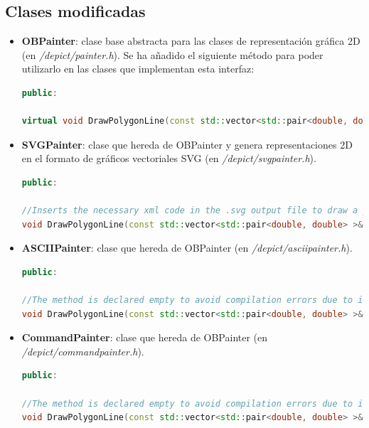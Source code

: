 \subsection{Clases modificadas}
\begin{itemize}
    \item \textbf{OBPainter}: clase base abstracta para las clases de representación gráfica 2D (en \textit{/depict/painter.h}). Se ha añadido el siguiente método para poder utilizarlo en las clases que implementan esta interfaz:
    \begin{lstlisting}[language=C++]
        public: 
    
virtual void DrawPolygonLine(const std::vector<std::pair<double, double> >& points) = 0;
    \end{lstlisting}

    \item \textbf{SVGPainter}: clase que hereda de OBPainter y genera representaciones 2D en el formato de gráficos vectoriales SVG (en \textit{/depict/svgpainter.h}).
    \begin{lstlisting}[language=C++]
        public: 
    
//Inserts the necessary xml code in the .svg output file to draw a polygon according to the vector of points specified by @p points
void DrawPolygonLine(const std::vector<std::pair<double, double> >& points);
    \end{lstlisting}

    \item \textbf{ASCIIPainter}: clase que hereda de OBPainter (en \textit{/depict/asciipainter.h}).
    \begin{lstlisting}[language=C++]
        public: 
    
//The method is declared empty to avoid compilation errors due to interface implementation. It has no use 
void DrawPolygonLine(const std::vector<std::pair<double, double> >& points);
    \end{lstlisting}

    \item \textbf{CommandPainter}: clase que hereda de OBPainter (en \textit{/depict/commandpainter.h}).
    \begin{lstlisting}[language=C++]
        public: 
    
//The method is declared empty to avoid compilation errors due to interface implementation. It has no use 
void DrawPolygonLine(const std::vector<std::pair<double, double> >& points);
    \end{lstlisting}


\end{itemize}
